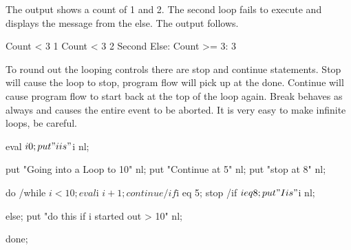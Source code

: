 
The output shows a count of 1 and 2.  The second loop fails to 
execute and displays the message from the else.  The output follows.

\begin{sfvcode}
Count < 3 1
Count < 3 2
Second Else: Count >= 3: 3
\end{sfvcode}

To round out the looping controls there are stop and continue statements.  Stop
will cause the loop to stop, program flow will pick up at the done.  Continue
will cause program flow to start back at the top of the loop again.  Break
behaves as always and causes the entire event to be aborted.  It is very easy
to make infinite loops, be careful.

\begin{sfvcode}
      eval $i 0;

      put "i is " $i nl;

      put "Going into a Loop to 10" nl;
      put "Continue at 5" nl;
      put "stop at 8" nl;

      do /while $i < 10;

          eval $i $i+1;

          continue /if $i eq 5;
          stop     /if $i eq 8;

          put "I is " $i nl;

      else;
          put "do this if i started out > 10" nl;

      done;
\end{sfvcode}


